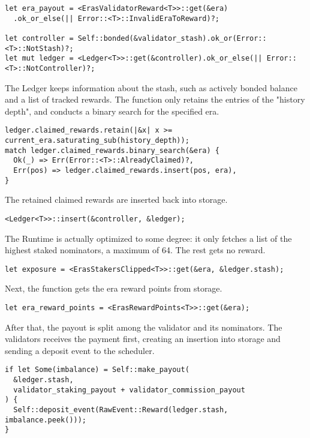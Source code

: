 \documentclass[11pt,a4paper]{article}
\begin{document}
\begin{verbatim}
let era_payout = <ErasValidatorReward<T>>::get(&era)
  .ok_or_else(|| Error::<T>::InvalidEraToReward)?;

let controller = Self::bonded(&validator_stash).ok_or(Error::<T>::NotStash)?;
let mut ledger = <Ledger<T>>::get(&controller).ok_or_else(|| Error::<T>::NotController)?;
\end{verbatim}

The Ledger keeps information about the stash, such as actively bonded balance
and a list of tracked rewards. The function only retains the entries of the
"history depth", and conducts a binary search for the specified era.

\begin{verbatim}
ledger.claimed_rewards.retain(|&x| x >= current_era.saturating_sub(history_depth));
match ledger.claimed_rewards.binary_search(&era) {
  Ok(_) => Err(Error::<T>::AlreadyClaimed)?,
  Err(pos) => ledger.claimed_rewards.insert(pos, era),
}
\end{verbatim}

The retained claimed rewards are inserted back into storage.

\begin{verbatim}
<Ledger<T>>::insert(&controller, &ledger);
\end{verbatim}

The Runtime is actually optimized to some degree: it only fetches a list of the
highest staked nominators, a maximum of 64. The rest gets no reward.

\begin{verbatim}
let exposure = <ErasStakersClipped<T>>::get(&era, &ledger.stash);
\end{verbatim}

Next, the function gets the era reward points from storage.

\begin{verbatim}
let era_reward_points = <ErasRewardPoints<T>>::get(&era);
\end{verbatim}

After that, the payout is split among the validator and its nominators. The
validators receives the payment first, creating an insertion into storage and
sending a deposit event to the scheduler.

\begin{verbatim}
if let Some(imbalance) = Self::make_payout(
  &ledger.stash,
  validator_staking_payout + validator_commission_payout
) {
  Self::deposit_event(RawEvent::Reward(ledger.stash, imbalance.peek()));
}
\end{verbatim}
\end{document}
